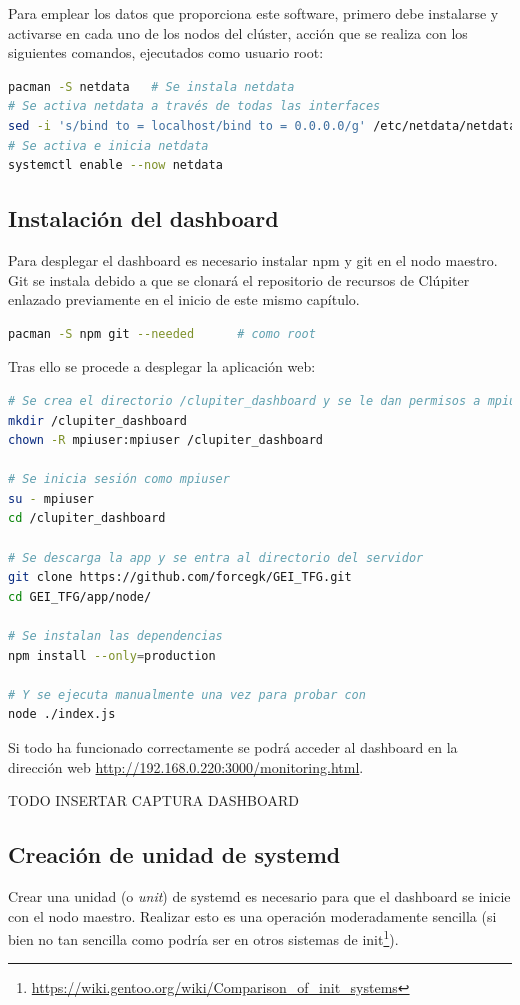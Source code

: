 Para emplear los datos que proporciona este software, primero debe instalarse y activarse en cada uno de los nodos del clúster, acción que se realiza con los siguientes comandos, ejecutados como usuario root:

\begin{lstlisting}[language=bash]
pacman -S netdata   # Se instala netdata
# Se activa netdata a través de todas las interfaces
sed -i 's/bind to = localhost/bind to = 0.0.0.0/g' /etc/netdata/netdata.conf
# Se activa e inicia netdata
systemctl enable --now netdata
\end{lstlisting}

\subsection{Instalación del dashboard}
Para desplegar el dashboard es necesario instalar npm y git en el nodo maestro. Git se instala debido a que se clonará el repositorio de recursos de Clúpiter enlazado previamente en el inicio de este mismo capítulo.
\begin{lstlisting}[language=bash]
pacman -S npm git --needed      # como root
\end{lstlisting}

Tras ello se procede a desplegar la aplicación web:
\begin{lstlisting}[language=bash]
# Se crea el directorio /clupiter_dashboard y se le dan permisos a mpiuser
mkdir /clupiter_dashboard
chown -R mpiuser:mpiuser /clupiter_dashboard

# Se inicia sesión como mpiuser
su - mpiuser
cd /clupiter_dashboard

# Se descarga la app y se entra al directorio del servidor
git clone https://github.com/forcegk/GEI_TFG.git
cd GEI_TFG/app/node/

# Se instalan las dependencias
npm install --only=production

# Y se ejecuta manualmente una vez para probar con
node ./index.js
\end{lstlisting}

Si todo ha funcionado correctamente se podrá acceder al dashboard en la dirección web \url{http://192.168.0.220:3000/monitoring.html}.


TODO INSERTAR CAPTURA DASHBOARD

\subsection{Creación de unidad de systemd}
Crear una unidad (o \textit{unit}) de systemd es necesario para que el dashboard se inicie con el nodo maestro. Realizar esto es una operación moderadamente sencilla (si bien no tan sencilla como podría ser en otros sistemas de init\footnote{\url{https://wiki.gentoo.org/wiki/Comparison_of_init_systems}}). 

